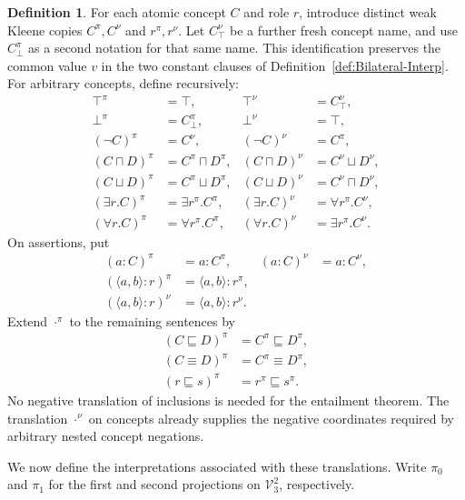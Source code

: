 \documentclass[letterpaper]{article} %
\theoremstyle{definition}
\theoremstyle{definition}
\newtheorem{definition}{Definition}
\theoremstyle{definition}
\theoremstyle{definition}
\theoremstyle{definition}
\begin{document}
\begin{definition}\label{def:pi-nu}
For each atomic concept $C$ and role $r$, introduce distinct weak Kleene copies $C^{\pi},C^{\nu}$ and $r^{\pi},r^{\nu}$. Let $C_{\top}^{\nu}$ be a further fresh concept name, and use $C_{\bot}^{\pi}$ as a second notation for that same name. This identification preserves the common value $v$ in the two constant clauses of Definition~\ref{def:Bilateral-Interp}. For arbitrary concepts, define recursively:
\begin{align*}
\top^{\pi}&=\top, &\top^{\nu}&=C_{\top}^{\nu},\\
\bot^{\pi}&=C_{\bot}^{\pi}, &\bot^{\nu}&=\top,\\
(\neg C)^{\pi}&=C^{\nu}, &(\neg C)^{\nu}&=C^{\pi},\\
(C\sqcap D)^{\pi}&=C^{\pi}\sqcap D^{\pi},
 &(C\sqcap D)^{\nu}&=C^{\nu}\sqcup D^{\nu},\\
(C\sqcup D)^{\pi}&=C^{\pi}\sqcup D^{\pi},
 &(C\sqcup D)^{\nu}&=C^{\nu}\sqcap D^{\nu},\\
(\exists r.C)^{\pi}&=\exists r^{\pi}.C^{\pi},
 &(\exists r.C)^{\nu}&=\forall r^{\pi}.C^{\nu},\\
(\forall r.C)^{\pi}&=\forall r^{\pi}.C^{\pi},
 &(\forall r.C)^{\nu}&=\exists r^{\pi}.C^{\nu}.
\end{align*}
On assertions, put
\begin{align*}
(a:C)^{\pi}&=a:C^{\pi}, &(a:C)^{\nu}&=a:C^{\nu},\\
(\langle a,b\rangle:r)^{\pi}&=\langle a,b\rangle:r^{\pi},\\
(\langle a,b\rangle:r)^{\nu}&=\langle a,b\rangle:r^{\nu}.
\end{align*}
Extend $\cdot^{\pi}$ to the remaining sentences by
\begin{align*}
(C\sqsubseteq D)^{\pi}&=C^{\pi}\sqsubseteq D^{\pi},\\
(C\equiv D)^{\pi}&=C^{\pi}\equiv D^{\pi},\\
(r\sqsubseteq s)^{\pi}&=r^{\pi}\sqsubseteq s^{\pi}.
\end{align*}
No negative translation of inclusions is needed for the entailment theorem. The translation $\cdot^{\nu}$ on concepts already supplies the negative coordinates required by arbitrary nested concept negations.
\end{definition}

We now define the interpretations associated with these translations. Write $\pi_0$ and $\pi_1$ for the first and second projections on $\mathcal{V}_3^2$, respectively.
\end{document}
